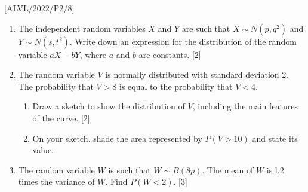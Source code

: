 \item {[}ALVL/2022/P2/8{]}
\begin{enumerate}
\item The independent random variables $X$ and $Y$ are such that $X\sim N\left(p,q^{2}\right)$
and $Y\sim N\left(s,t^{2}\right)$. Write down an expression for the
distribution of the random variable $aX-bY$, where $a$ and $b$
are constants. \hfill{}{[}2{]}
\item The random variable $V$ is normally distributed with standard deviation
2. The probability that $V>8$ is equal to the probability that $V<4$. 
\begin{enumerate}
\item Draw a sketch to show the distribution of $V$, including the main
features of the curve. \hfill{}{[}2{]}
\item On your sketch. shade the area represented by $P\left(V>10\right)$
and state its value. 
\end{enumerate}
\item The random variable $W$ is such that $W\sim B(8p)$. The mean of
$W$ is l.2 times the variance of $W$. Find $P\left(W<2\right)$.\hfill{}
{[}3{]}
\end{enumerate}
